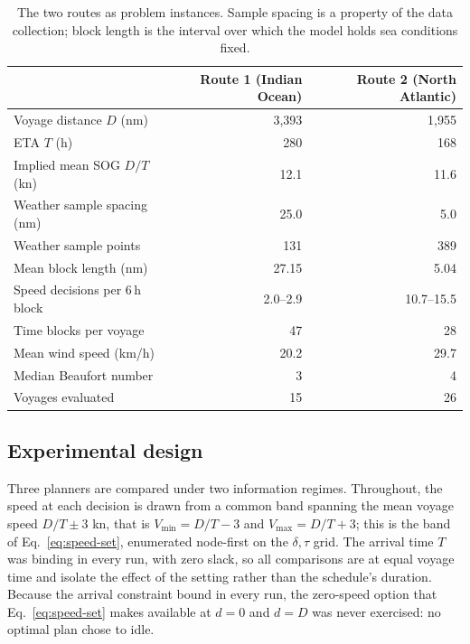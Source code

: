 \documentclass[review,authoryear]{elsarticle}
\begin{document}
\begin{table}[ht]
\centering
\footnotesize
\caption{The two routes as problem instances. Sample spacing is a property of the data collection;
block length is the interval over which the model holds sea conditions fixed.}
\label{tab:instances}
\begin{tabular}{lrr}
\toprule
 & Route 1 (Indian Ocean) & Route 2 (North Atlantic) \\
\midrule
Voyage distance $D$ (nm)            & 3{,}393 & 1{,}955 \\
ETA $T$ (h)                          & 280     & 168 \\
Implied mean SOG $D/T$ (kn)          & 12.1    & 11.6 \\
\midrule
Weather sample spacing (nm)          & 25.0    & 5.0 \\
Weather sample points                & 131     & 389 \\
Mean block length (nm)               & 27.15   & 5.04 \\
Speed decisions per 6\,h block       & 2.0--2.9 & 10.7--15.5 \\
Time blocks per voyage               & 47      & 28 \\
\midrule
Mean wind speed (km/h)               & 20.2    & 29.7 \\
Median Beaufort number               & 3       & 4 \\
\midrule
Voyages evaluated                    & 15      & 26 \\
\bottomrule
\end{tabular}
\end{table}

\subsection{Experimental design}
Three planners are compared under two information regimes. Throughout, the speed at each decision is
drawn from a common band spanning the mean voyage speed $D/T \pm 3$ kn, that is $V_{\min}=D/T-3$ and
$V_{\max}=D/T+3$; this is the band of Eq.~\eqref{eq:speed-set}, enumerated node-first on the
$\delta,\tau$ grid. The arrival time $T$ was binding in every run, with zero slack, so all
comparisons are at equal voyage time and isolate the effect of the setting rather than the
schedule's duration. Because
the arrival constraint bound in every run, the zero-speed option that Eq.~\eqref{eq:speed-set} makes
available at $d=0$ and $d=D$ was never exercised: no optimal plan chose to idle.
\end{document}
